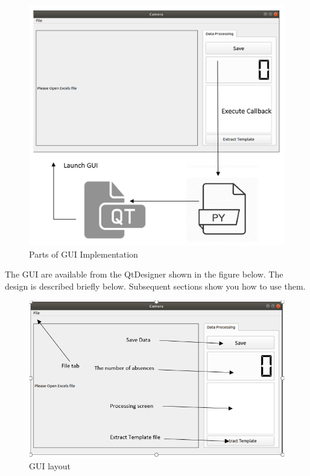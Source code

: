 \documentclass[journal, twocolumn]{IEEEtran}
\begin{document}
\begin{figure}[!h]
	\centering
	\includegraphics[width=0.8\linewidth]{img/gui.png}
	\caption{Parts of GUI Implementation}\label{fig:gui}
\end{figure}

The GUI are available from the QtDesigner shown in the figure below. The design is described briefly below. Subsequent sections show you how to use them.

\begin{figure}[!h]
	\centering
	\includegraphics[width=0.8\linewidth]{img/user_guide.png}
	\caption{GUI layout}\label{fig:user_guide}
\end{figure}
\end{document}
